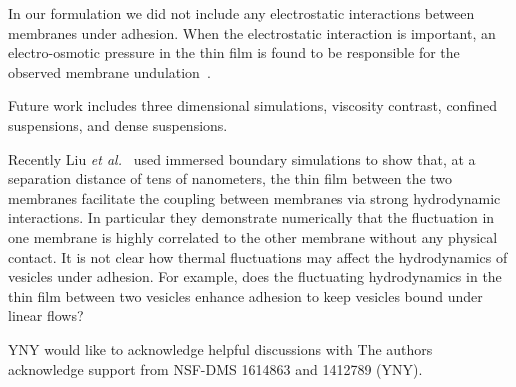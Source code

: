 \documentclass[prf,superscriptaddress,showpacs]{revtex4-1}
\begin{document}
In our formulation we did not include any electrostatic interactions
between membranes under adhesion. When the electrostatic interaction is
important, an electro-osmotic pressure in the thin film is found to be
responsible for the observed membrane undulation~\cite{LiraDimova}.

Future work includes three dimensional simulations, viscosity contrast,
confined suspensions, and dense suspensions.

Recently Liu {\em et al.}~\cite{LiuChuNewbyRead2018_bioRxiv} used
immersed boundary simulations to show that, at a separation distance of
tens of nanometers, the thin film between the two membranes facilitate
the coupling between membranes via strong hydrodynamic interactions. In
particular they demonstrate numerically that the fluctuation in one
membrane is highly correlated to the other membrane without any physical
contact. It is not clear how thermal fluctuations may affect the
hydrodynamics of vesicles under adhesion. For example, does the
fluctuating hydrodynamics in the thin film between two vesicles enhance
adhesion to keep vesicles bound under linear flows?

\acknowledgments

YNY would like to acknowledge helpful discussions with 
The authors acknowledge support from NSF-DMS 1614863 and 1412789 (YNY).
\end{document}
